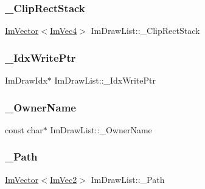 \hypertarget{struct_im_draw_list_ae950024f053f3c94dc2c763d20be609d}{}\label{struct_im_draw_list_ae950024f053f3c94dc2c763d20be609d} 
\subsubsection{\texorpdfstring{\+\_\+\+Clip\+Rect\+Stack}{\_ClipRectStack}}
{\footnotesize\ttfamily \hyperlink{class_im_vector}{Im\+Vector}$<$\hyperlink{struct_im_vec4}{Im\+Vec4}$>$ Im\+Draw\+List\+::\+\_\+\+Clip\+Rect\+Stack}

\hypertarget{struct_im_draw_list_a771f4c7f71873852fe030c3e498e5843}{}\label{struct_im_draw_list_a771f4c7f71873852fe030c3e498e5843} 
\subsubsection{\texorpdfstring{\+\_\+\+Idx\+Write\+Ptr}{\_IdxWritePtr}}
{\footnotesize\ttfamily Im\+Draw\+Idx$\ast$ Im\+Draw\+List\+::\+\_\+\+Idx\+Write\+Ptr}

\hypertarget{struct_im_draw_list_a643f385fb9d5fc35a431e72a10a212f5}{}\label{struct_im_draw_list_a643f385fb9d5fc35a431e72a10a212f5} 
\subsubsection{\texorpdfstring{\+\_\+\+Owner\+Name}{\_OwnerName}}
{\footnotesize\ttfamily const char$\ast$ Im\+Draw\+List\+::\+\_\+\+Owner\+Name}

\hypertarget{struct_im_draw_list_a5bdc39abf351360500048628b8dc1b07}{}\label{struct_im_draw_list_a5bdc39abf351360500048628b8dc1b07} 
\subsubsection{\texorpdfstring{\+\_\+\+Path}{\_Path}}
{\footnotesize\ttfamily \hyperlink{class_im_vector}{Im\+Vector}$<$\hyperlink{struct_im_vec2}{Im\+Vec2}$>$ Im\+Draw\+List\+::\+\_\+\+Path}

